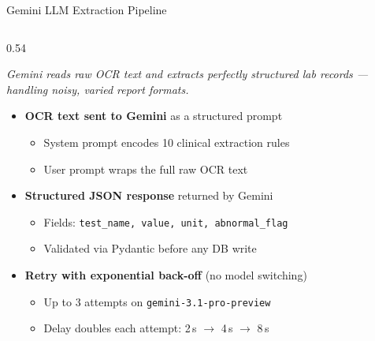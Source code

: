 \documentclass[aspectratio=169,11pt]{beamer}
\begin{document}
\begin{frame}{Gemini LLM Extraction Pipeline}

  \begin{columns}[T]

    \begin{column}{0.54\textwidth}

      {\small\itshape\color{Gray}%
        Gemini reads raw OCR text and extracts perfectly structured
        lab records --- handling noisy, varied report formats.}

      \vspace{0.18cm}

      \begin{itemize}
        \setlength{\itemsep}{4pt}

        \item \textbf{OCR text sent to Gemini} as a structured prompt
          \begin{itemize}
            \setlength{\itemsep}{1pt}
            \item System prompt encodes 10 clinical extraction rules
            \item User prompt wraps the full raw OCR text
          \end{itemize}

        \item \textbf{Structured JSON response} returned by Gemini
          \begin{itemize}
            \setlength{\itemsep}{1pt}
            \item Fields: \texttt{test\_name, value, unit, abnormal\_flag}
            \item Validated via Pydantic before any DB write
          \end{itemize}

        \item \textbf{Retry with exponential back-off} (no model switching)
          \begin{itemize}
            \setlength{\itemsep}{1pt}
            \item Up to 3 attempts on \texttt{gemini-3.1-pro-preview}
            \item Delay doubles each attempt: 2\,s $\to$ 4\,s $\to$ 8\,s
          \end{itemize}


\end{itemize}
\end{column}
\end{columns}
\end{frame}
\end{document}
